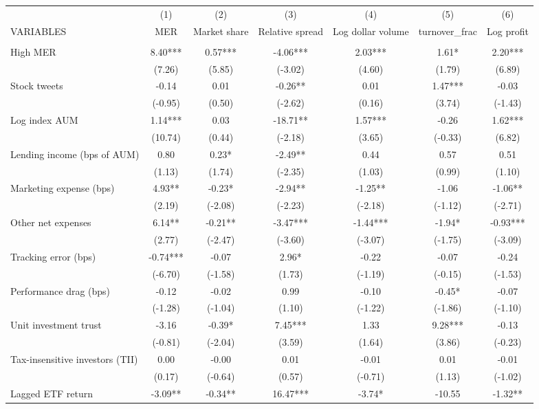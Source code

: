 \documentclass[]{article}
\begin{document}
\begin{tabular}{lcccccc} \hline
 & (1) & (2) & (3) & (4) & (5) & (6) \\
VARIABLES & MER & Market share & Relative spread & Log dollar volume & turnover\_frac & Log profit \\ \hline
 &  &  &  &  &  &  \\
High MER & 8.40*** & 0.57*** & -4.06*** & 2.03*** & 1.61* & 2.20*** \\
 & (7.26) & (5.85) & (-3.02) & (4.60) & (1.79) & (6.89) \\
Stock tweets & -0.14 & 0.01 & -0.26** & 0.01 & 1.47*** & -0.03 \\
 & (-0.95) & (0.50) & (-2.62) & (0.16) & (3.74) & (-1.43) \\
Log index AUM & 1.14*** & 0.03 & -18.71** & 1.57*** & -0.26 & 1.62*** \\
 & (10.74) & (0.44) & (-2.18) & (3.65) & (-0.33) & (6.82) \\
Lending income (bps of AUM) & 0.80 & 0.23* & -2.49** & 0.44 & 0.57 & 0.51 \\
 & (1.13) & (1.74) & (-2.35) & (1.03) & (0.99) & (1.10) \\
Marketing expense (bps) & 4.93** & -0.23* & -2.94** & -1.25** & -1.06 & -1.06** \\
 & (2.19) & (-2.08) & (-2.23) & (-2.18) & (-1.12) & (-2.71) \\
Other net expenses & 6.14** & -0.21** & -3.47*** & -1.44*** & -1.94* & -0.93*** \\
 & (2.77) & (-2.47) & (-3.60) & (-3.07) & (-1.75) & (-3.09) \\
Tracking error (bps) & -0.74*** & -0.07 & 2.96* & -0.22 & -0.07 & -0.24 \\
 & (-6.70) & (-1.58) & (1.73) & (-1.19) & (-0.15) & (-1.53) \\
Performance drag (bps) & -0.12 & -0.02 & 0.99 & -0.10 & -0.45* & -0.07 \\
 & (-1.28) & (-1.04) & (1.10) & (-1.22) & (-1.86) & (-1.10) \\
Unit investment trust & -3.16 & -0.39* & 7.45*** & 1.33 & 9.28*** & -0.13 \\
 & (-0.81) & (-2.04) & (3.59) & (1.64) & (3.86) & (-0.23) \\
Tax-insensitive investors (TII) & 0.00 & -0.00 & 0.01 & -0.01 & 0.01 & -0.01 \\
 & (0.17) & (-0.64) & (0.57) & (-0.71) & (1.13) & (-1.02) \\
Lagged ETF return & -3.09** & -0.34** & 16.47*** & -3.74* & -10.55 & -1.32** \\

\end{tabular}
\end{document}
